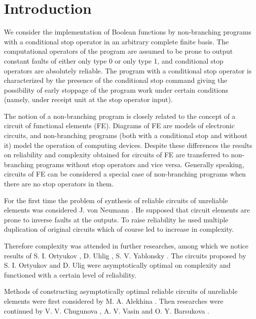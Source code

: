\documentclass[
11pt,%
tightenlines,%
twoside,%
onecolumn,%
nofloats,%
nobibnotes,%
nofootinbib,%
superscriptaddress,%
noshowpacs,%
centertags]%
{revtex4}
\begin{document}
\maketitle


\section{Introduction}

We consider the implementation of Boolean functions by non-branching programs with a conditional stop operator \cite{1,2} in an arbitrary complete finite basis. The computational operators of the program are assumed to be prone to output constant faults of either only type 0 or only type 1, and conditional stop operators are absolutely reliable. The program with a conditional stop operator is characterized by the presence of the conditional stop command giving the possibility of early stoppage of the program work under certain conditions (namely, under receipt unit at the stop operator input).

The notion of a non-branching program is closely related to the concept of a circuit of functional elements (FE). Diagrams of FE are models of electronic circuits, and non-branching programs (both with a conditional stop and without it) model the operation of computing devices. Despite these differences the results on reliability and complexity obtained for circuits of FE are transferred to non-branching programs without stop operators and vice versa. Generally speaking, circuits of FE can be considered a special case of non-branching programs when there are no stop operators in them.


For the first time the problem of synthesis of reliable circuits of unreliable elements was considered J. von Neumann \cite{3}. He supposed that circuit elements are prone to inverse faults at the outputs. To raise reliability he used multiple duplication of original circuits which of course led to increase in complexity.

Therefore complexity was attended in further researches, among which we notice results of \linebreak S. I. Ortyukov \cite{4}, D. Uhlig \cite{5}, S. V. Yablonsky \cite{6}. The circuits proposed by S. I. Ortyukov and D. Ulig were asymptotically optimal on complexity and functioned with a certain level of reliability.

Methods of constructing asymptotically optimal reliable circuits of unreliable elements were first considered by M. A. Alekhina \cite{7}. Then researches were continued by V. V. Chugunova \cite{8}, \linebreak A. V. Vasin \cite{9} and O. Y. Barsukova \cite{10}.
\end{document}
